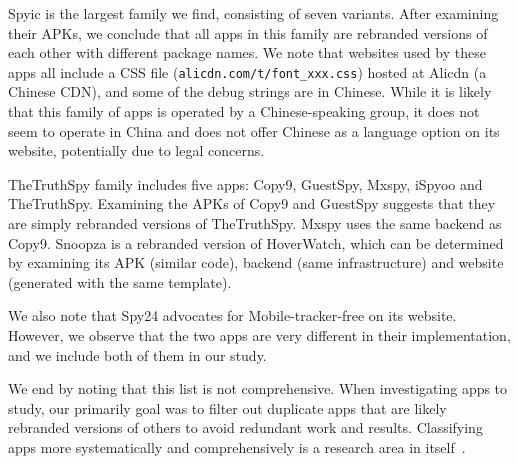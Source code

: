 \documentclass[sigconf,balance=false]{acmart}
\begin{document}
Spyic is the largest family we find, consisting of seven variants.
After examining their APKs, we conclude that all apps in this family
are rebranded versions of each other with different package names.  We
note that websites used by these apps all include a CSS file
(\texttt{alicdn.com/t/font\_xxx.css}) hosted at Alicdn (a Chinese
CDN), and some of the debug strings are in Chinese.
While it is likely that this family of apps is operated
by a Chinese-speaking group, it does not seem to operate in China and
does not offer Chinese as a language option on its website,
potentially due to legal concerns.

TheTruthSpy family includes five apps: Copy9, GuestSpy, Mxspy, iSpyoo
and TheTruthSpy. Examining the APKs of Copy9 and GuestSpy suggests that
they are simply rebranded versions of TheTruthSpy. Mxspy uses the same
backend as Copy9.  Snoopza is a rebranded version of HoverWatch, which
can be determined by examining its APK (similar code), backend (same
infrastructure) and website (generated with the same
template).

We also note that Spy24 advocates for Mobile-tracker-free on its
website. However, we observe that the two apps are very different in
their implementation, and we include both of them in our study.

We end by noting that this list is not comprehensive.  When investigating apps
to study, our primarily goal was to filter out duplicate apps that are
likely rebranded versions of others to avoid redundant work and
results.  Classifying apps more systematically and comprehensively is
a research area in itself~\cite{SuarezTangil2013Dendroid,
Zhang2014Semantics, deshotels2014droidlegacy, pierazzi2020data}.


\newcommand{\hash}[1]{\texttt{#1}}
\end{document}
